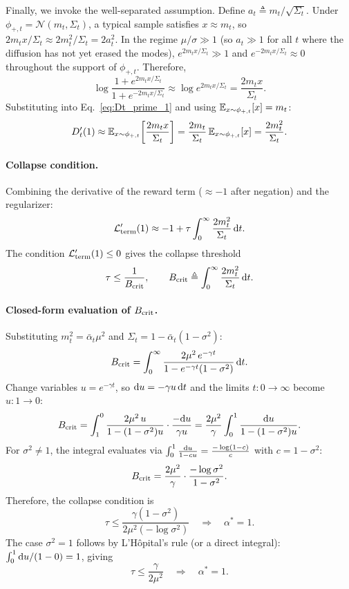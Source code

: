 Finally, we invoke the well-separated assumption. Define $a_t\triangleq m_t/\sqrt{\Sigma_t}$. Under $\phi_{+,t}=\mathcal{N}(m_t,\Sigma_t)$, a typical sample satisfies $x\approx m_t$, so $2m_t x/\Sigma_t\approx 2m_t^2/\Sigma_t=2a_t^2$. In the regime $\mu/\sigma\gg1$ (so $a_t\gg1$ for all $t$ where the diffusion has not yet erased the modes), $e^{2m_tx/\Sigma_t}\gg1$ and $e^{-2m_tx/\Sigma_t}\approx0$ throughout the support of $\phi_{+,t}$. Therefore,
\[
\log\frac{1+e^{2m_tx/\Sigma_t}}{1+e^{-2m_tx/\Sigma_t}}
\approx
\log e^{2m_tx/\Sigma_t}
=
\frac{2m_t x}{\Sigma_t}.
\]
Substituting into Eq.~\eqref{eq:Dt_prime_1} and using $\mathbb{E}_{x\sim\phi_{+,t}}[x]=m_t$:
\[
D_t'(1)
\approx
\mathbb{E}_{x\sim\phi_{+,t}}\!\left[\frac{2m_t x}{\Sigma_t}\right]
=
\frac{2m_t}{\Sigma_t}\,\mathbb{E}_{x\sim\phi_{+,t}}[x]
=
\frac{2m_t^2}{\Sigma_t}.
\]

\paragraph{Collapse condition.}
Combining the derivative of the reward term ($\approx -1$ after negation) and the regularizer:
\[
\mathcal{L}_{\rm term}'(1)
\approx
-1
+
\tau\int_0^\infty
\frac{2m_t^2}{\Sigma_t}\,\mathrm{d} t.
\]
The condition $\mathcal{L}_{\rm term}'(1)\le0$ gives the collapse threshold
\[
\tau
\le
\frac{1}{B_{\rm crit}},
\qquad
B_{\rm crit}
\triangleq
\int_0^\infty
\frac{2m_t^2}{\Sigma_t}\,\mathrm{d} t.
\]

\paragraph{Closed-form evaluation of $B_{\rm crit}$.}
Substituting $m_t^2=\bar\alpha_t\mu^2$ and $\Sigma_t=1-\bar\alpha_t(1-\sigma^2)$:
\[
B_{\rm crit}
=
\int_0^\infty
\frac{2\mu^2\,e^{-\gamma t}}
{1-e^{-\gamma t}(1-\sigma^2)}
\,\mathrm{d} t.
\]
Change variables $u=e^{-\gamma t}$, so $\mathrm{d} u=-\gamma u\,\mathrm{d} t$ and the limits $t:0\to\infty$ become $u:1\to 0$:
\[
B_{\rm crit}
=
\int_1^0
\frac{2\mu^2\,u}
{1-(1-\sigma^2)u}
\cdot\frac{-\mathrm{d} u}{\gamma u}
=
\frac{2\mu^2}{\gamma}
\int_0^1
\frac{\mathrm{d} u}{1-(1-\sigma^2)u}.
\]
For $\sigma^2\neq1$, the integral evaluates via $\int_0^1\frac{\mathrm{d} u}{1-cu}=\frac{-\log(1-c)}{c}$ with $c=1-\sigma^2$:
\[
B_{\rm crit}
=
\frac{2\mu^2}{\gamma}\cdot\frac{-\log\sigma^2}{1-\sigma^2}.
\]
Therefore, the collapse condition is
\[
\boxed{
\tau
\le
\frac{\gamma(1-\sigma^2)}{2\mu^2(-\log\sigma^2)}
\quad
\Longrightarrow
\quad
\alpha^*=1.
}
\]
The case $\sigma^2=1$ follows by L'H\^opital's rule (or a direct integral): $\int_0^1 \mathrm{d} u/(1-0)=1$, giving
\[
\boxed{
\tau\le \frac{\gamma}{2\mu^2}
\quad
\Longrightarrow
\quad
\alpha^*=1.
}
\]

